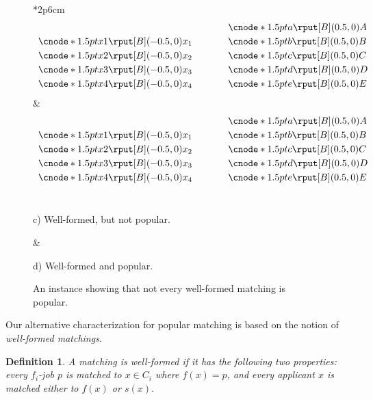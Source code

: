 \documentclass[11pt]{article}
\newcommand{\first}{f}
\newcommand{\second}{s}
\newtheorem{definition}{Definition}
\begin{document}
\begin{figure}[t]
\begin{center}
\begin{tabular}{*{2}{p{6cm}}}
\[\begin{array}{ll}
 & \cnode*{1.5pt}{a} \rput[B](0.5,0){A} \\[0.1cm]
\cnode*{1.5pt}{x1} \rput[B](-0.5,0){x_1}  \hspace{2.75em} & \cnode*{1.5pt}{b} \rput[B](0.5,0){B} \\[0.1cm]
\cnode*{1.5pt}{x2} \rput[B](-0.5,0){x_2}   & \cnode*{1.5pt}{c} \rput[B](0.5,0){C} \\[0.1cm]
\cnode*{1.5pt}{x3} \rput[B](-0.5,0){x_3}   & \cnode*{1.5pt}{d} \rput[B](0.5,0){D} \\[0.1cm]
\cnode*{1.5pt}{x4} \rput[B](-0.5,0){x_4}   & \cnode*{1.5pt}{e} \rput[B](0.5,0){E}
\end{array}\]
&
\[\begin{array}{ll}
 & \cnode*{1.5pt}{a} \rput[B](0.5,0){A} \\[0.1cm]
\cnode*{1.5pt}{x1} \rput[B](-0.5,0){x_1}  \hspace{2.75em}  & \cnode*{1.5pt}{b} \rput[B](0.5,0){B} \\[0.1cm]
\cnode*{1.5pt}{x2} \rput[B](-0.5,0){x_2}   & \cnode*{1.5pt}{c} \rput[B](0.5,0){C} \\[0.1cm]
\cnode*{1.5pt}{x3} \rput[B](-0.5,0){x_3}   & \cnode*{1.5pt}{d} \rput[B](0.5,0){D} \\[0.1cm]
\cnode*{1.5pt}{x4} \rput[B](-0.5,0){x_4}   & \cnode*{1.5pt}{e} \rput[B](0.5,0){E}
\end{array}\]
\\[-1em]

\begin{center}
c) Well-formed, but not popular.
\end{center}
&
\begin{center}
d) Well-formed and popular.
\end{center}

\end{tabular}

\caption{An instance showing that not every well-formed matching is popular. \label{figure:instance}}

\end{center}

\end{figure}

Our alternative characterization for popular matching is based on the notion of \emph{well-formed matchings}.
\begin{definition}
A matching is well-formed if it has the following two properties: every $\first_i$-job $p$ is matched to $x \in C_i$ where $\first(x) = p$, and every applicant $x$ is matched either to $\first(x)$ or $\second(x)$. 
\end{definition}
\end{document}

